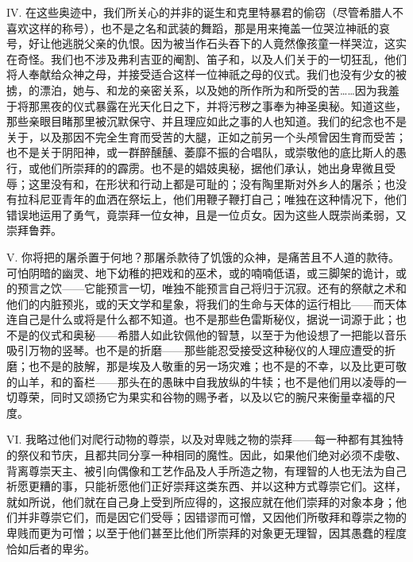 IV. 在这些奥迹中，我们所关心的并非的诞生和克里特暴君的偷窃（尽管希腊人不喜欢这样的称号），也不是之名和武装的舞蹈，那是用来掩盖一位哭泣神祇的哀号，好让他逃脱父亲的仇恨。因为被当作石头吞下的人竟然像孩童一样哭泣，这实在奇怪。我们也不涉及弗利吉亚的阉割、笛子和，以及人们关于的一切狂乱，他们将人奉献给众神之母，并接受适合这样一位神祇之母的仪式。我们也没有少女的被掳，的漂泊，她与、和龙的亲密关系，以及她的所作所为和所受的苦……因为我羞于将那黑夜的仪式暴露在光天化日之下，并将污秽之事奉为神圣奥秘。知道这些，那些亲眼目睹那里被沉默保守、并且理应如此之事的人也知道。我们的纪念也不是关于，以及那因不完全生育而受苦的大腿，正如之前另一个头颅曾因生育而受苦；也不是关于阴阳神，或一群醉醺醺、萎靡不振的合唱队，或崇敬他的底比斯人的愚行，或他们所崇拜的的霹雳。也不是的娼妓奥秘，据他们承认，她出身卑微且受辱；这里没有和，在形状和行动上都是可耻的；没有陶里斯对外乡人的屠杀；也没有拉科尼亚青年的血洒在祭坛上，他们用鞭子鞭打自己；唯独在这种情况下，他们错误地运用了勇气，竟崇拜一位女神，且是一位贞女。因为这些人既崇尚柔弱，又崇拜鲁莽。\par

V. 你将把的屠杀置于何地？那屠杀款待了饥饿的众神，是痛苦且不人道的款待。可怕阴暗的幽灵、地下幼稚的把戏和的巫术，或的喃喃低语，或三脚架的诡计，或的预言之饮——它能预言一切，唯独不能预言自己将归于沉寂。还有的祭献之术和他们的内脏预兆，或的天文学和星象，将我们的生命与天体的运行相比——而天体连自己是什么或将是什么都不知道。也不是那些色雷斯秘仪，据说一词源于此；也不是的仪式和奥秘——希腊人如此钦佩他的智慧，以至于为他设想了一把能以音乐吸引万物的竖琴。也不是的折磨——那些能忍受接受这种秘仪的人理应遭受的折磨；也不是的肢解，那是埃及人敬重的另一场灾难；也不是的不幸，以及比更可敬的山羊，和的畜栏——那头在的愚昧中自我放纵的牛犊；也不是他们用以凌辱的一切尊荣，同时又颂扬它为果实和谷物的赐予者，以及以它的腕尺来衡量幸福的尺度。\par

VI. 我略过他们对爬行动物的尊崇，以及对卑贱之物的崇拜——每一种都有其独特的祭仪和节庆，且都共同分享一种相同的魔性。因此，如果他们绝对必须不虔敬、背离尊崇天主、被引向偶像和工艺作品及人手所造之物，有理智的人也无法为自己祈愿更糟的事，只能祈愿他们正好崇拜这类东西、并以这种方式尊崇它们。这样，就如所说，他们就在自己身上受到所应得的，这报应就在他们崇拜的对象本身；他们并非尊崇它们，而是因它们受辱；因错谬而可憎，又因他们所敬拜和尊崇之物的卑贱而更为可憎；以至于他们甚至比他们所崇拜的对象更无理智，因其愚蠢的程度恰如后者的卑劣。\par

